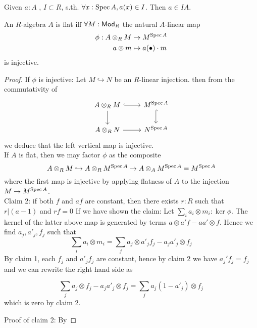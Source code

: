 \documentclass{article}
\begin{document}
\begin{lemma}
	Given $a : A$ , $I \subset R$, s.th. $\forall x : \operatorname{Spec} A , a(x) \in I$. Then $a \in IA$.
\end{lemma}
\begin{prop}
	An $R$-algebra $A$ is flat iff $\forall M : \operatorname{\mathsf{Mod}}_R$ the natural $A$-linear map
	\begin{align*}
	\phi: A \otimes_R M &\to M^{\operatorname{Spec} A} \\
	a \otimes m &\mapsto a(\bullet) \cdot m
	\end{align*}
	is injective.
\end{prop}
\begin{proof}

	If $\phi$ is injective: Let $ M \hookrightarrow N$ be an $R$-linear injection. then from the commutativity of
	\[\begin{tikzcd}
		{A \otimes_R M} & {M^{\Spec A}} \\
		{A \otimes_R N} & {N^{\Spec A}}
		\arrow[hook, from=1-1, to=1-2]
		\arrow[from=1-1, to=2-1]
		\arrow[hook, from=1-2, to=2-2]
		\arrow[from=2-1, to=2-2]
	\end{tikzcd}\]
we deduce that the left vertical map is injective. \\

If $A$ is flat, then we may factor $\phi$ as the composite
\[
A \otimes_R M \hookrightarrow A \otimes_R M^{\operatorname{Spec} A} \to A \otimes_A M^{\operatorname{Spec} A} = M^{\operatorname{Spec} A}
\]
where the first map is injective by applying flatness of $A$ to the injection $M \to M^{\operatorname{Spec} A}$. \\

Claim 2: if both $f$ and $af$ are constant, then there exists $r : R$ such that $r | (a-1)$ and $r f = 0$
If we have shown the claim:
Let $\sum_i a_i \otimes m_i : \ker \phi$.
The kernel of the latter above map is generated by terms $a \otimes a'f - aa' \otimes f$.
Hence we find $a_j , a'_j, f_j$ such that 
\[
\sum_i a_i \otimes m_i = \sum_j a_j \otimes a'_j f_j - a_j a'_j \otimes f_j
\]
By claim 1, each $f_j$ and $a'_j f_j$ are constant, hence by claim 2 we have $a_j' f_j = f_j$ and we can rewrite the right hand side as

\[
\sum_j a_j \otimes f_j - a_j a'_j \otimes f_j = \sum_j a_j (1 - a'_j) \otimes f_j 
\]
which is zero by claim 2.

Proof of claim 2:
By 


\end{proof}
\end{document}
